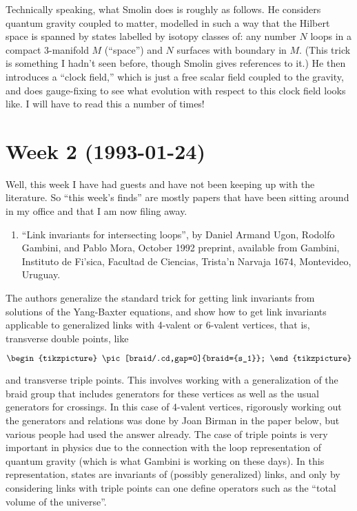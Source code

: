 \documentclass{article}
\def\tightlist{}
\begin{document}
Technically speaking, what Smolin does is roughly as follows. He
considers quantum gravity coupled to matter, modelled in such a way that
the Hilbert space is spanned by states labelled by isotopy classes of:
any number \(N\) loops in a compact 3-manifold \(M\) (``space'') and
\(N\) surfaces with boundary in \(M\). (This trick is something I hadn't
seen before, though Smolin gives references to it.) He then introduces a
``clock field,'' which is just a free scalar field coupled to the
gravity, and does gauge-fixing to see what evolution with respect to
this clock field looks like. I will have to read this a number of times!
\hypertarget{week-2-1993-01-24}{%
\section{Week 2 (1993-01-24)}\label{week-2-1993-01-24}}

Well, this week I have had guests and have not been keeping up with the
literature. So ``this week's finds'' are mostly papers that have been
sitting around in my office and that I am now filing away.

\begin{enumerate}
\def\labelenumi{\arabic{enumi})}
\tightlist
\item
  ``Link invariants for intersecting loops'', by Daniel Armand Ugon,
  Rodolfo Gambini, and Pablo Mora, October 1992 preprint, available from
  Gambini, Instituto de Fi'sica, Facultad de Ciencias, Trista'n Narvaja
  1674, Montevideo, Uruguay.
\end{enumerate}

The authors generalize the standard trick for getting link invariants
from solutions of the Yang-Baxter equations, and show how to get link
invariants applicable to generalized links with 4-valent or 6-valent
vertices, that is, transverse double points, like

\[
  \begin{tikzpicture}
    \pic[braid/.cd,gap=0]{braid={s_1}};
  \end{tikzpicture}
\]

and transverse triple points. This involves working with a
generalization of the braid group that includes generators for these
vertices as well as the usual generators for crossings. In this case of
4-valent vertices, rigorously working out the generators and relations
was done by Joan Birman in the paper below, but various people had used
the answer already. The case of triple points is very important in
physics due to the connection with the loop representation of quantum
gravity (which is what Gambini is working on these days). In this
representation, states are invariants of (possibly generalized) links,
and only by considering links with triple points can one define
operators such as the ``total volume of the universe''.
\end{document}
